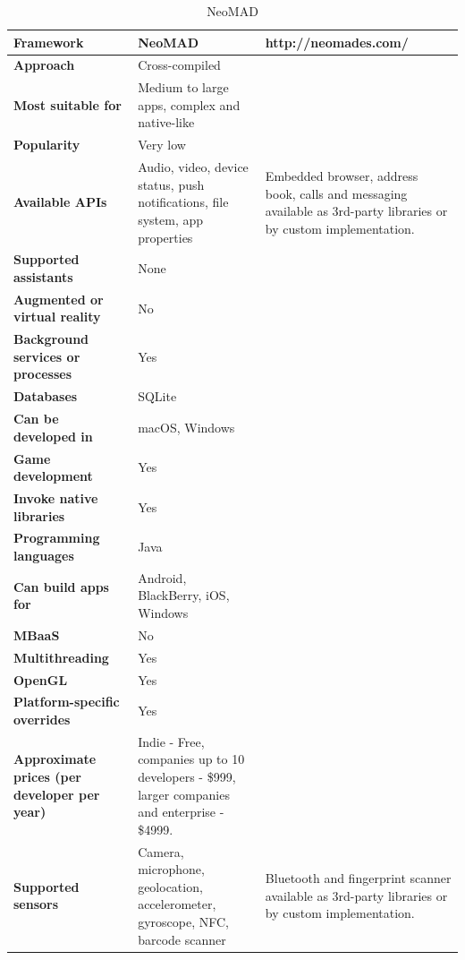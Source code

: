 \documentclass[english,master,public,dept460,male,cpdeclaration,oneside]{diploma}
\begin{document}
\begin{table}[!h]
	\centering
	\caption{NeoMAD}
	\begin{tabular}{p{} | p{} | p{}}
		\toprule		
		\textbf{Framework} & \textbf{NeoMAD} & http://neomades.com/ \\
		\midrule
		\textbf{Approach} & Cross-compiled & \\			
		\midrule	
		\textbf{Most suitable for} & Medium to large apps, complex and native-like & \\
		\midrule
		\textbf{Popularity} & Very low & \\			
		\midrule
		\textbf{Available APIs} & Audio, video, device status, push notifications, file system, app properties & Embedded browser, address book, calls and messaging available as 3rd-party libraries or by custom implementation. \\			
		\midrule
		\textbf{Supported assistants} & None & \\			
		\midrule
		\textbf{Augmented or virtual reality} & No & \\			
		\midrule
		\textbf{Background services or processes} & Yes & \\			
		\midrule
		\textbf{Databases} & SQLite & \\			
		\midrule
		\textbf{Can be developed in} & macOS, Windows &  \\			
		\midrule
		\textbf{Game development} & Yes & \\			
		\midrule
		\textbf{Invoke native libraries} & Yes & \\			
		\midrule
		\textbf{Programming languages} & Java & \\			
		\midrule
		\textbf{Can build apps for} & Android, BlackBerry, iOS, Windows & \\			
		\midrule
		\textbf{MBaaS} & No & \\			
		\midrule
		\textbf{Multithreading} & Yes & \\			
		\midrule
		\textbf{OpenGL} & Yes & \\			
		\midrule
		\textbf{Platform-specific overrides} & Yes & \\			
		\midrule
		\textbf{Approximate prices (per developer per year)} & Indie - Free, companies up to 10 developers - \$999, larger companies and enterprise - \$4999. & \\			
		\midrule
		\textbf{Supported sensors} & Camera, microphone, geolocation, accelerometer, gyroscope, NFC, barcode scanner & Bluetooth and fingerprint scanner available as 3rd-party libraries or by custom implementation. \\			
		\midrule
	\end{tabular}
\end{table}
\end{document}
